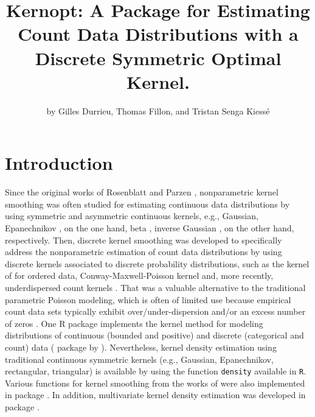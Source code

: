 \title{Kernopt: A Package for Estimating Count Data Distributions with a Discrete Symmetric Optimal Kernel.}


\author{by Gilles Durrieu, Thomas Fillon, and Tristan Senga Kiessé}

\maketitle


\section{Introduction}\label{introduction}

Since the original works of Rosenblatt \citep{Rosenblatt1956} and Parzen \citep{Parzen1962}, nonparametric kernel smoothing was often studied for estimating continuous data distributions by using symmetric and asymmetric continuous kernels, e.g., Gaussian, Epanechnikov \citep{Epan69}, on the one hand, beta \citep{Chen99}, inverse Gaussian \citep{scaillet2004}, on the other hand, respectively. Then, discrete kernel smoothing was developed to specifically address the nonparametric estimation of count data distributions by using discrete kernels associated to discrete probability distributions, such as the kernel of \citet{Racine2020} for ordered data, Conway-Maxwell-Poisson kernel \citep{Huang2022} and, more recently, underdispersed count kernels \citep{Kokon_etal_2023}. That was a valuable alternative to the traditional parametric Poisson modeling, which is often of limited use because empirical count data sets typically exhibit over/under-dispersion and/or an excess number of zeros \citep{KokonSenga11}. One R package implements the kernel method for modeling distributions of continuous (bounded and positive) and discrete (categorical and count) data ( package by \citet{Wansouwe2016}). Nevertheless, kernel density estimation using traditional continuous symmetric kernels (e.g., Gaussian, Epanechnikov, rectangular, triangular) is available by using the function \texttt{density} available in \texttt{R}. Various functions for kernel smoothing from the works of \citet{WandJones1995} were also implemented in  package \citep{Kernsmooth}. In addition, multivariate kernel density estimation was developed in  package \citep{Duong2007}.

